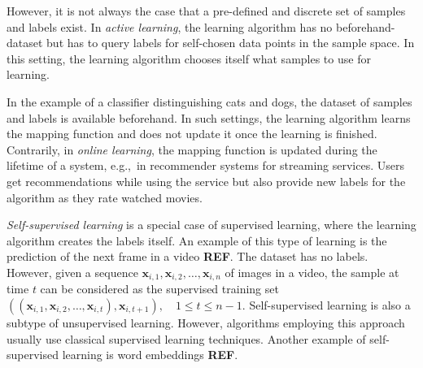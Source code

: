 However, it is not always the case that a pre-defined and discrete set of samples and labels exist.
In \textit{active learning}, the learning algorithm has no beforehand-dataset but has to query labels for self-chosen data points in the sample space.
In this setting, the learning algorithm chooses itself what samples to use for learning.

In the example of a classifier distinguishing cats and dogs, the dataset of samples and labels is available beforehand.
In such settings, the learning algorithm learns the mapping function and does not update it once the learning is finished.
Contrarily, in \textit{online learning}, the mapping function is updated during the lifetime of a system, e.g.,~in recommender systems for streaming services.
Users get recommendations while using the service but also provide new labels for the algorithm as they rate watched movies.

\textit{Self-supervised learning} is a special case of supervised learning, where the learning algorithm creates the labels itself.
An example of this type of learning is the prediction of the next frame in a video \textbf{REF}.
The dataset has no labels.
However, given a sequence $\bm{x}_{i,1},\bm{x}_{i,2},\dots,\bm{x}_{i,n}$ of images in a video, the sample at time $t$ can be considered as the supervised training set $((\bm{x}_{i,1},\bm{x}_{i,2},\dots,\bm{x}_{i,t}),\bm{x}_{i,t+1}), \quad 1\leq t\leq n-1$.
Self-supervised learning is also a subtype of unsupervised learning.
However, algorithms employing this approach usually use classical supervised learning techniques.
Another example of self-supervised learning is word embeddings \textbf{REF}.

